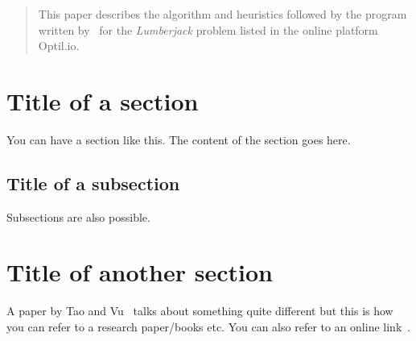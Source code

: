 \documentclass[12pt]{article}
\begin{document}
\maketitle

\begin{abstract} %
This paper describes the algorithm and heuristics followed by the program written by \myteam\ for the 
\textit{Lumberjack} problem listed in the online platform Optil.io.
\end{abstract}

\section{Title of a section}
You can have a section like this. The content of the section goes here.
\subsection{Title of a subsection}
Subsections are also possible.
\section{Title of another section}
A paper by Tao and Vu~\cite{TaoV17} talks about something quite different but this is how you can refer to a research paper/books etc.
You can also refer to an online link~\cite{bworld}. 



\end{document}
